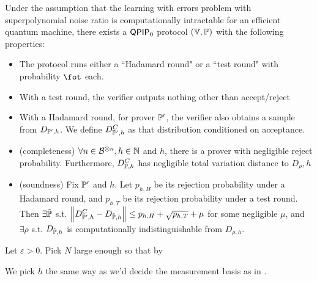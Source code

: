 \begin{theorem}
    \label{Mahadev_QPIP0_Protocol_Interface}
	Under the assumption that the learning with errors problem with superpolynomial noise ratio is computationally intractable for an efficient quantum machine, there exists a $\operatorname{\mathsf{QPIP}}_0$ protocol $(\mathbb{V}, \mathbb{P})$ with the following properties:
	\begin{itemize}
	    \item The protocol runs either a ``Hadamard round" or a ``test round" with probability $\fot$ each.
	    \item With a test round, the verifier outputs nothing other than accept/reject
	    \item With a Hadamard round, for prover $\mathbb{P}'$, the verifier also obtains a sample from $D_{\mathbb{P}', h}$. We define $D^C_{\mathbb{P}', h}$ as that distribution conditioned on acceptance.
	    \item (completeness) $\forall n\in\mathcal{B}^{\otimes n}, h\in\mathbb{N}$ and $h$, there is a prover with negligible reject probability. Furthermore, $D^C_{\mathbb{P}, h}$ has negligible total variation distance to $D_\rho, h$
	    \item (soundness) Fix $\mathbb{P}'$ and $h$. Let $p_{h, H}$ be its rejection probability under a Hadamard round, and $p_{h, T}$ be its rejection probability under a test round. Then $\exists\tilde{\mathbb{P}}$ s.t. $\left\lVert D^C_{\mathbb{P}', h} - D_{\tilde{\mathbb{P}}, h}\right\rVert\leq p_{h,H} + \sqrt{p_{h, T}}+\mu$ for some negligible $\mu$, and $\exists\rho$ s.t. $D_{\tilde{\mathbb{P}}, h}$ is computationally indistinguishable from $D_{\rho, h}$.
	\end{itemize}
\end{theorem}


Let $\varepsilon>0$. Pick $N$ large enough so that by 

We pick $h$ the same way as we'd decide the measurement basis as in .


